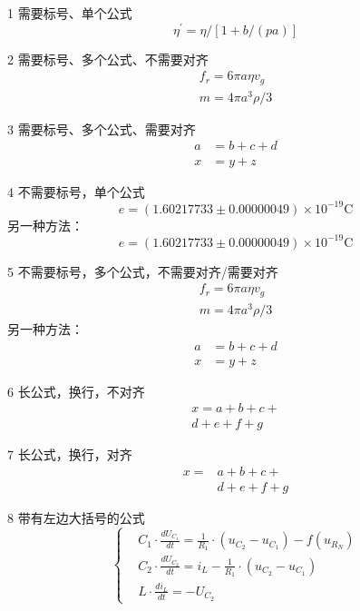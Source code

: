 \documentclass[10pt,a4paper,twocolumn,twoside,UTF8]{ctexart}
\begin{document}
	1 需要标号、单个公式
		\begin{equation}
		\eta^{\prime}=\eta /[1+b /(p a)]
		\end{equation}

	2 需要标号、多个公式、不需要对齐
		\begin{gather}
		f_r=6\pi a \eta v_g   \\
		m=4 \pi a^{3} \rho / 3
		\end{gather}

	3 需要标号、多个公式、需要对齐
		\begin{align}
		a &= b+c+d \\
		x &= y+z
		\end{align}

	4 不需要标号，单个公式
		\[e=(1.60217733 \pm 0.00000049) \times 10^{-19} \mathrm{C}\]
		另一种方法：
		\begin{equation*}
		e=(1.60217733 \pm 0.00000049) \times 10^{-19} \mathrm{C}
		\end{equation*}

	5 不需要标号，多个公式，不需要对齐/需要对齐
		\begin{gather*}
		f_r=6\pi a \eta v_g   \\
		m=4 \pi a^{3} \rho / 3
		\end{gather*}
		另一种方法：
		\begin{align*}
		a &= b+c+d \\
		x &= y+z
		\end{align*}

	6 长公式，换行，不对齐
		\begin{multline}
		x = a+b+c+{} \\
		d+e+f+g
		\end{multline}

	7 长公式，换行，对齐
		\[\begin{aligned}
		x ={}&a+b+c+{} \\
		&d+e+f+g
		\end{aligned}\]

	8 带有左边大括号的公式
	\[\left\{
		\begin{aligned}
		&C_{1} \cdot \frac{d U_{C_{1}}}{d t}=\frac{1}{R_{1}} \cdot(u_{C_{2}}-u_{C_{1}})-f(u_{R_{N}}) \\
		&C_{2} \cdot \frac{d U_{C_{2}}}{d t}=i_{L}-\frac{1}{R_{1}} \cdot(u_{C_{2}}-u_{C_{1}}) \\
		&L \cdot \frac{d i_{L}}{d t}=-U_{C_{2}}
		\end{aligned}
	   \right.
	\]
\end{document}
